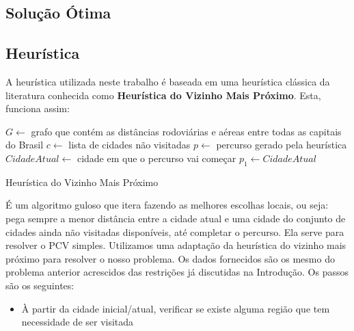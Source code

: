 \documentclass[12pt]{article}
\begin{document}
\subsection{Solução Ótima}


\subsection{Heurística}
A heurística utilizada neste trabalho é baseada em uma heurística clássica da literatura
conhecida como \textbf{Heurística do Vizinho Mais Próximo}. Esta, funciona assim:

\begin{algorithm}[h!]
\begin{footnotesize}
  $G \longleftarrow $ grafo que contém as distâncias rodoviárias e aéreas entre todas as 
  capitais do Brasil\;
  $c \longleftarrow $ lista de cidades não visitadas\;
  $p \longleftarrow $ percurso gerado pela heurística\;
  $CidadeAtual \longleftarrow $ cidade em que o percurso vai começar\;
  $p_{1} \longleftarrow CidadeAtual$\;
\caption{Heurística do Vizinho Mais Próximo}
\end{footnotesize}
\end{algorithm}

É um algoritmo guloso que itera fazendo as melhores escolhas locais, ou seja:
pega sempre a menor distância entre a cidade atual e uma cidade do conjunto de cidades ainda
não visitadas disponíveis, até completar o percurso. Ela serve para resolver o PCV simples. 
Utilizamos uma adaptação da heurística do vizinho mais próximo para resolver o nosso problema.
Os dados fornecidos são os mesmo do problema anterior acrescidos das restrições já discutidas na 
Introdução. Os passos são os seguintes:

\begin{itemize}
  \item À partir da cidade inicial/atual, verificar se existe alguma região que tem necessidade
  de ser visitada
  
\end{itemize}
\end{document}

